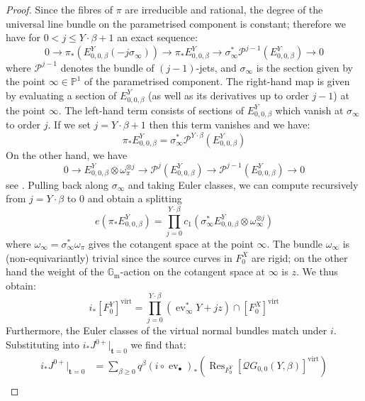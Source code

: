 \documentclass[11pt]{amsart}
\newcommand{\QG}[4]{\mathcal{Q}G_{#1,#2}(#3,#4)}
\newcommand{\PP}{\mathbb P}
\renewcommand{\to}{\rightarrow}
\newcommand{\Gm}{\mathbb{G}_{\text{m}}}
\newcommand{\virt}[1]{[#1]^{\operatorname{virt}}}
\newcommand{\ev}{\operatorname{ev}}
\theoremstyle{definition}
\theoremstyle{definition}
\begin{document}
\begin{proof}
Since the fibres of $\pi$ are irreducible and rational, the degree of the universal line bundle on the parametrised component is constant; therefore we have for $0 < j \leq Y\cdot\beta + 1$ an exact sequence:
\begin{equation*} 0 \to \pi_* (E^Y_{0,0,\beta}(-j\sigma_\infty)) \to \pi_* E^Y_{0,0,\beta} \to \sigma_\infty^*\mathcal{P}^{j-1}(E^Y_{0,0,\beta}) \to 0 \end{equation*}
where $\mathcal{P}^{j-1}$ denotes the bundle of $(j-1)$-jets, and $\sigma_{\infty}$ is the section given by the point $\infty \in \PP^1$ of the parametrised component. The right-hand map is given by evaluating a section of $E_{0,0,\beta}^Y$ (as well as its derivatives up to order $j-1$) at the point $\infty$. The left-hand term consists of sections of $E_{0,0,\beta}^Y$ which vanish at $\sigma_\infty$ to order $j$. If we set $j=Y\cdot\beta+1$ then this term vanishes and we have:
\begin{equation*} \pi_* E_{0,0,\beta}^Y = \sigma_\infty^* \mathcal{P}^{Y\cdot\beta}(E_{0,0,\beta}^Y) \end{equation*}
On the other hand, we have
\begin{equation*} 0 \to E^Y_{0,0,\beta} \otimes \omega_\pi^{\otimes j} \to \mathcal{P}^{j}(E^Y_{0,0,\beta}) \to \mathcal{P}^{j-1}(E^Y_{0,0,\beta}) \to 0
\end{equation*}
see \cite[\S 2]{Ga}. Pulling back along $\sigma_\infty$ and taking Euler classes, we can compute recursively from $j = Y \cdot \beta$ to $0$ and obtain a splitting
\begin{equation*}
e(\pi_* E^Y_{0,0,\beta})=\prod_{j=0}^{Y\cdot\beta} c_1(\sigma_\infty^* E^Y_{0,0,\beta}\otimes \omega_{\infty}^{\otimes j})
\end{equation*}
where $\omega_\infty=\sigma_\infty^*\omega_\pi$ gives the cotangent space at the point $\infty$. The bundle $\omega_\infty$ is (non-equivariantly) trivial since the source curves in $F_0^X$ are rigid; on the other hand the weight of the $\Gm$-action on the cotangent space at $\infty$ is $z$. We thus obtain:
\begin{equation*} i_*\virt{F_0^Y}=\prod_{j=0}^{Y\cdot\beta}(\ev_\infty^* Y+jz)\cap \virt{F_0^X} \end{equation*}
Furthermore, the Euler classes of the virtual normal bundles match under $i$. Substituting into $i_*J^{0+}|_{\mathbf{t}=0}$ we find that:
\begin{align*} i_* {J^{0+}}|_{{\mathbf{t}=0}} & = \sum_{\beta\geq 0}q^\beta(i\circ\ev_\bullet)_* \left( \operatorname{Res}_{F_0^Y}\virt{\QG{0}{0}{Y}{\beta}} \right) \\

\end{align*}
\end{proof}
\end{document}
